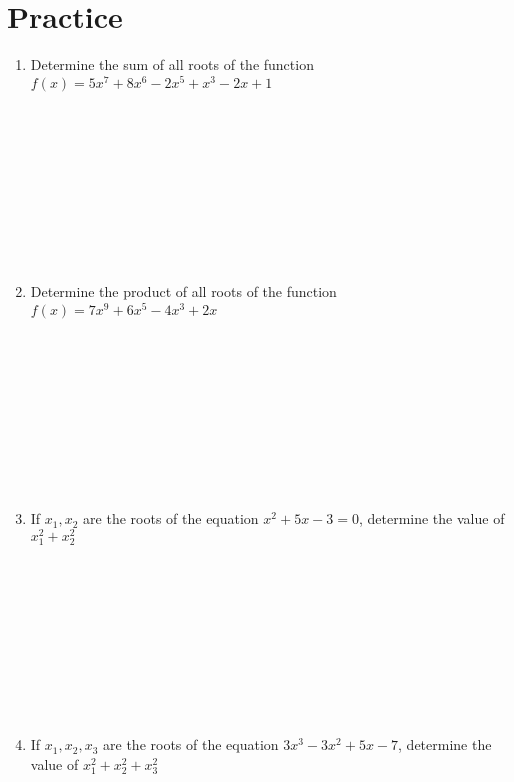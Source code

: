 \documentclass[12pt]{article}
\begin{document}
\newpage

\newcommand{\spacing}{\\ \\ \\ \\ \\ \\ \\ \\ \\ \\}
\section{Practice}
\begin{enumerate}
    \item Determine the sum of all roots of the function $f(x) = 5x^7 + 8x^6 - 2x^5 + x^3 - 2x + 1$ \spacing
    \item Determine the product of all roots of the function $f(x) = 7x^9 + 6x^5 - 4x^3 + 2x$ \spacing
    \item If $x_1, x_2$ are the roots of the equation $x^2 + 5x - 3 = 0$, determine the value of $x_1^2 + x_2^2$ \spacing
    \item If $x_1, x_2, x_3$ are the roots of the equation $3x^3 - 3x^2 + 5x - 7$, determine the value of $x_1^2 + x_2^2 + x_3^2$ \spacing
\end{enumerate}
\end{document}
